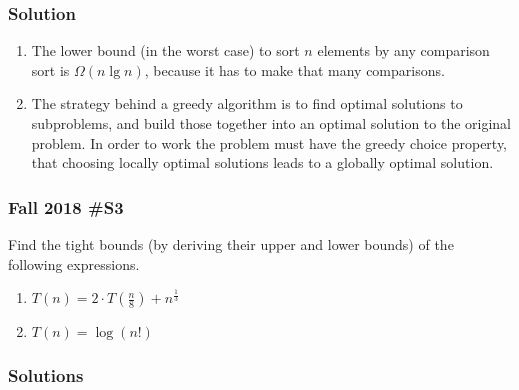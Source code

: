 \subsubsection{Solution}

\begin{enumerate}[label=\alph*.]
	\item The lower bound (in the worst case) to sort $n$ elements by any comparison sort is $\Omega ( n \lg n )$, because it has to make that many comparisons.  
	\item The strategy behind a greedy algorithm is to find optimal solutions to subproblems, and build those together into an optimal solution to the original problem.  In order to work the problem must have the greedy choice property, that choosing locally optimal solutions leads to a globally optimal solution.  
\end{enumerate}

\subsubsection{Fall 2018 \#S3}	
	Find the tight bounds (by deriving their upper and lower bounds) of the following expressions.
	\begin{enumerate}[label=\alph*.]
		\item $\displaystyle T(n) = 2 \cdot T \left( \frac{n}{8} \right) + n^{\frac{1}{3}}$
		
		\vskip 6pt
		
		\item $T(n) = \log(n!)$
	\end{enumerate}
	
\subsubsection{Solutions}

